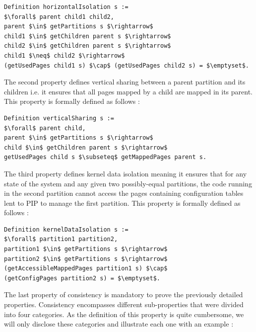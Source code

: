 \begin{lstlisting}[caption = {Horizontal isolation}, mathescape=true,xleftmargin=.02\textwidth,
xrightmargin=.02\textwidth]
Definition horizontalIsolation s :=
$\forall$ parent child1 child2,
parent $\in$ getPartitions s $\rightarrow$
child1 $\in$ getChildren parent s $\rightarrow$
child2 $\in$ getChildren parent s $\rightarrow$
child1 $\neq$ child2 $\rightarrow$
(getUsedPages child1 s) $\cap$ (getUsedPages child2 s) = $\emptyset$.
\end{lstlisting}
The second property defines vertical sharing between a parent partition and its children i.e. it ensures that all pages mapped by a child are mapped in its parent. This property is formally defined as follows :
\begin{lstlisting}[caption = {Vertical sharing}, mathescape=true,xleftmargin=.08\textwidth,
xrightmargin=.08\textwidth]
Definition verticalSharing s :=
$\forall$ parent child,
parent $\in$ getPartitions s $\rightarrow$
child $\in$ getChildren parent s $\rightarrow$
getUsedPages child s $\subseteq$ getMappedPages parent s.
\end{lstlisting}
The third property defines kernel data isolation meaning it ensures that for any state of the system and any given two possibly-equal partitions, the code running in the second partition cannot access the pages containing configuration tables lent to PIP to manage the first partition. This property is formally defined as follows :
\begin{lstlisting}[caption = {Kernel data isolation}, mathescape=true,xleftmargin=.12\textwidth,
xrightmargin=.12\textwidth]
Definition kernelDataIsolation s :=
$\forall$ partition1 partition2,
partition1 $\in$ getPartitions s $\rightarrow$
partition2 $\in$ getPartitions s $\rightarrow$
(getAccessibleMappedPages partition1 s) $\cap$
(getConfigPages partition2 s) = $\emptyset$.
\end{lstlisting}
The last property of consistency is mandatory to prove the previously detailed properties. Consistency encompasses different sub-properties that were divided into four categories. As the definition of this property is quite cumbersome, we will only disclose these categories and illustrate each one with an example :
